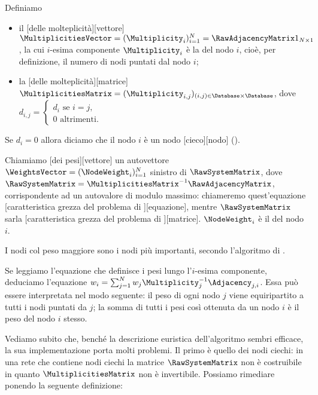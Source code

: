 \begin{Definition}
	Definiamo
	\begin{itemize}
		\item il [delle molteplicit\`a][vettore] $\MultiplicitiesVector = (\Multiplicity_i)_{i = 1}^N = \RawAdjacencyMatrix \Ones{N}{1}$, la cui $i$-esima componente $\Multiplicity_i$ \`e la  del nodo $i$, cio\`e, per definizione, il numero di nodi puntati dal nodo $i$;
		\item la [delle molteplicit\`a][matrice] $\MultiplicitiesMatrix = (\Multiplicity_{i,j})_{(i,j) \in \Database \times \Database}$, dove $d_{i,j} = \begin{cases} d_i\text{ se }i = j,\\0\text{ altrimenti}.\end{cases}$
	\end{itemize}
	Se $d_i = 0$ allora diciamo che il nodo $i$ \`e un nodo [cieco][nodo] ().
\end{Definition}
\begin{Definition}
	Chiamiamo [dei pesi][vettore] un autovettore $\WeightsVector = (\NodeWeight_i)_{i = 1}^N$ sinistro di $\RawSystemMatrix$, dove $\RawSystemMatrix = \MultiplicitiesMatrix^{-1}\RawAdjacencyMatrix$, corrispondente ad un autovalore di modulo massimo: chiameremo quest'equazione [caratteristica grezza del problema di \PageRank][equazione], mentre $\RawSystemMatrix$ sar\a la [caratteristica grezza del problema di \PageRank][matrice]. $\NodeWeight_i$ \`e il  del nodo $i$.
\end{Definition}
\par I nodi col peso maggiore sono i nodi pi\`u importanti, secondo l'algoritmo di \PageRank.
\par Se leggiamo l'equazione che definisce i pesi lungo l'$i$-esima componente, deduciamo l'equazione $w_i = \sum_{j = 1}^N w_j \Multiplicity_j^{-1} \Adjacency_{j,i}$. Essa pu\`o essere interpretata nel modo seguente: il peso di ogni nodo $j$ viene equiripartito a tutti i nodi puntati da $j$; la somma di tutti i pesi cos\`i ottenuta da un nodo $i$ \`e il peso del nodo $i$ stesso.
\par Vediamo subito che, bench\'e la descrizione euristica dell'algoritmo sembri efficace, la sua implementazione porta molti problemi. Il primo \`e quello dei nodi ciechi: in una rete che contiene nodi ciechi la matrice $\RawSystemMatrix$ non \`e costruibile in quanto $\MultiplicitiesMatrix$ non \`e invertibile. Possiamo rimediare ponendo la seguente definizione:
